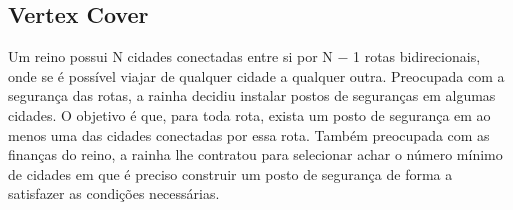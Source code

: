 \documentclass[a4paper,12pt]{article}
\begin{document}

\subsection{Vertex Cover}
\indent Um reino possui N cidades conectadas entre si por N − 1 rotas bidirecionais, onde se é possível viajar de qualquer cidade a qualquer outra. Preocupada com a segurança das rotas, a rainha decidiu instalar postos de seguranças em algumas cidades. O objetivo é que, para toda rota, exista um posto de segurança em ao menos uma das cidades conectadas por essa rota. Também preocupada com as finanças do reino, a rainha lhe contratou para selecionar achar o número mínimo de cidades em que é preciso construir um posto de segurança de forma a satisfazer as condições necessárias.

\end{document}
